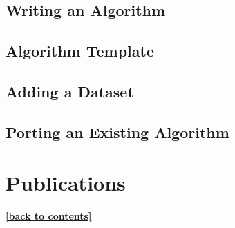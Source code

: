 \documentclass[a4paper,10pt,DIV=12]{scrreprt}
\begin{document}
\section{Writing an Algorithm}
\section{Algorithm Template}
\section{Adding a Dataset}
\section{Porting an Existing Algorithm}

\chapter{Publications}
\hyperlink{toc}{\footnotesize \bf [back to contents]}
\end{document}
